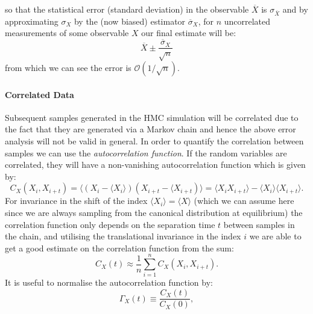 \documentclass[12pt]{article}
\begin{document}
            so that the statistical error (standard deviation) in the observable $\overline{X}$ is $\sigma_{\overline{X}}$ and by approximating $\sigma_X$ by the (now biased) estimator $\overline{\sigma}_X$, for $n$ uncorrelated measurements of some observable $X$ our final estimate will be:
            \begin{equation}
                \label{eq:niaveerror}
                \overline{X}\pm \frac{\overline{\sigma}_X}{\sqrt{n}}
            \end{equation}
            from which we can see the error is $\mathcal{O}\left(1/\sqrt{n}\right)$.



            \paragraph{Correlated Data} Subsequent samples generated in the HMC simulation will be correlated due to the fact that they are generated via a Markov chain and hence the above error analysis will not be valid in general. In order to quantify the correlation between samples we can use the \textit{autocorrelation function}. If the random variables are correlated, they will have a non-vanishing autocorrelation function which is given by:
            \begin{equation}
                \label{eq:autocorrelationfunction}
                C_{X}\left(X_i,X_{i+t}\right) = \langle \left(X_i-\langle X_i\rangle\right)\left(X_{i+t}-\langle X_{i+t}\right)\rangle = \langle X_iX_{i+t}\rangle - \langle X_i \rangle \langle X_{i+t} \rangle.
            \end{equation}
            For invariance in the shift of the index $\langle X_i \rangle = \langle X \rangle$ (which we can assume here since we are always sampling from the canonical distribution at equilibrium) the correlation function only depends on the separation time $t$ between samples in the chain, and utilising the translational invariance in the index $i$ we are able to get a good estimate on the correlation function from the sum:
            \begin{equation}
                C_{X}\left(t\right) \approx \frac{1}{n}\sum_{i=1}^nC_X\left(X_i,X_{i+t}\right).
            \end{equation}
            It is useful to normalise the autocorrelation function by:
            \begin{equation}
                \label{eq:normalisedAutocorrelation}
                \Gamma_{X}\left(t\right) \equiv \frac{C_X\left(t\right)}{C_X\left(0\right)},
            \end{equation}
\end{document}
